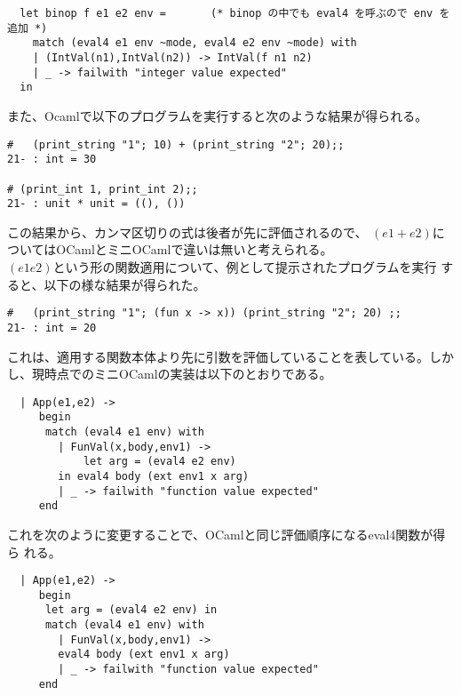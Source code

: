 \documentclass[a4paper,9pt]{jarticle}
\begin{document}
\begin{lstlisting}
  let binop f e1 e2 env =       (* binop の中でも eval4 を呼ぶので env を追加 *)
    match (eval4 e1 env ~mode, eval4 e2 env ~mode) with
    | (IntVal(n1),IntVal(n2)) -> IntVal(f n1 n2)
    | _ -> failwith "integer value expected"
  in 
\end{lstlisting}
また、Ocamlで以下のプログラムを実行すると次のような結果が得られる。
\begin{lstlisting}
#   (print_string "1"; 10) + (print_string "2"; 20);;
21- : int = 30

# (print_int 1, print_int 2);;
21- : unit * unit = ((), ())
\end{lstlisting}
この結果から、カンマ区切りの式は後者が先に評価されるので、
$(e1+e2)$についてはOCamlとミニOCamlで違いは無いと考えられる。\\

$(e1 e2)$という形の関数適用について、例として提示されたプログラムを実行
すると、以下の様な結果が得られた。

\begin{lstlisting}
#   (print_string "1"; (fun x -> x)) (print_string "2"; 20) ;;
21- : int = 20
\end{lstlisting}
これは、適用する関数本体より先に引数を評価していることを表している。しか
し、現時点でのミニOCamlの実装は以下のとおりである。

\begin{lstlisting}
  | App(e1,e2) ->
     begin
      match (eval4 e1 env) with
        | FunVal(x,body,env1) ->
            let arg = (eval4 e2 env) 
	    in eval4 body (ext env1 x arg)
        | _ -> failwith "function value expected"
     end
\end{lstlisting}
これを次のように変更することで、OCamlと同じ評価順序になるeval4関数が得ら
れる。

\begin{lstlisting}
  | App(e1,e2) ->
     begin
      let arg = (eval4 e2 env) in
      match (eval4 e1 env) with
        | FunVal(x,body,env1) ->
	    eval4 body (ext env1 x arg)
        | _ -> failwith "function value expected"
     end
\end{lstlisting}
\end{document}
